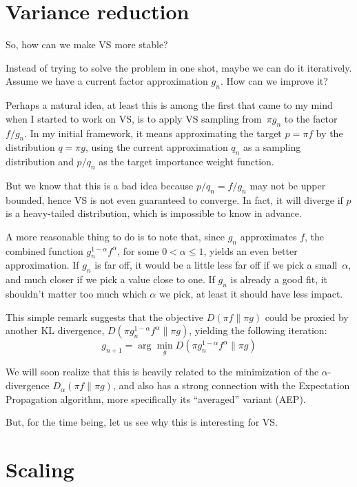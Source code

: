 \documentclass{article}
\begin{document}
\section{Variance reduction}

So, how can we make VS more stable?

Instead of trying to solve the problem in one shot, maybe we can do it iteratively. Assume we have a current factor approximation $g_n$. How can we improve it?

Perhaps a natural idea, at least this is among the first that came to my mind when I started to work on VS, is to apply VS sampling from~$\pi g_n$ to the factor $f/g_n$. In my initial framework, it means approximating the target $p=\pi f$ by the distribution $q=\pi g$, using the current approximation $q_n$ as a sampling distribution and $p/q_n$ as the target importance weight function.

But we know that this is a bad idea because $p/q_n=f/g_n$ may not be upper bounded, hence VS is not even guaranteed to converge. In fact, it will diverge if $p$ is a heavy-tailed distribution, which is impossible to know in advance.

A more reasonable thing to do is to note that, since $g_n$ approximates $f$, the combined function $g_n^{1-\alpha}f^\alpha$, for some $0< \alpha\leq 1$, yields an even better approximation. If $g_n$ is far off, it would be a little less far off if we pick a small~$\alpha$, and much closer if we pick a value close to one. If $g_n$ is already a good fit, it shouldn't matter too much which $\alpha$ we pick, at least it should have less impact.

This simple remark suggests that the objective $D(\pi f\|\pi g)$ could be proxied by another KL divergence, $D(\pi g_n^{1-\alpha}f^\alpha \| \pi g)$, yielding the following iteration:
$$
g_{n+1} = \arg\min_g D(\pi g_n^{1-\alpha}f^\alpha \| \pi g)
$$

We will soon realize that this is heavily related to the minimization of the $\alpha$-divergence $D_\alpha(\pi f\|\pi g)$, and also has a strong connection with the Expectation Propagation algorithm, more specifically its ``averaged'' variant (AEP). 

But, for the time being, let us see why this is interesting for VS. 


\section{Scaling}
\end{document}
